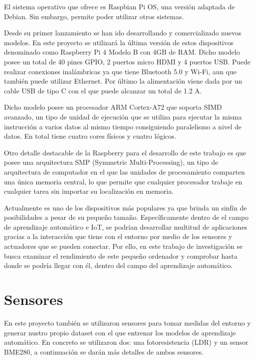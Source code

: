 \documentclass[a4paper, 12pt]{book}
\begin{document}
El sistema operativo que ofrece es Raspbian Pi OS, una versión adaptada de Debian. Sin embargo, permite poder utilizar otros sistemas.

Desde su primer lanzamiento se han ido desarrollando y comercializado nuevos modelos. En este proyecto se utilizará la última versión de estos dispositivos denominado como Raspberry Pi 4 Modelo B con 4GB de RAM. Dicho modelo posee un total de 40 pines GPIO, 2 puertos micro HDMI y 4 puertos USB. Puede realizar conexiones inalámbricas ya que tiene Bluetooth 5.0 y Wi-Fi, aun que también puede utilizar Ethernet. Por último la alimentación viene dada por un cable USB de tipo C con el que puede alcanzar un total de 1.2 A.

Dicho modelo posee un procesador ARM Cortex-A72 que soporta SIMD avanzado, un tipo de unidad de ejecución que se utiliza para ejecutar la misma instrucción a varios datos al mismo tiempo consiguiendo paralelismo a nivel de datos. En total tiene cuatro cores físicos y cuatro lógicos. 

Otro detalle destacable de la Raspberry para el desarrollo de este trabajo es que posee una arquitectura SMP (Symmetric Multi-Processing), un tipo de arquitectura de computador en el que las unidades de procesamiento comparten una única memoria central, lo que permite que cualquier procesador trabaje en cualquier tarea sin importar su localización en memoria. 

Actualmente es uno de los dispositivos más populares ya que brinda un sinfín de posibilidades a pesar de su pequeño tamaño. Específicamente dentro de el campo de aprendizaje automático e IoT, se podrían desarrollar multitud de aplicaciones gracias a la interacción que tiene con el entorno por medio de los sensores y actuadores que se pueden conectar. Por ello, en este trabajo de investigación se busca examinar el rendimiento de este pequeño ordenador y comprobar hasta donde se podría llegar con él, dentro del campo del aprendizaje automático. 


\section{Sensores}
\label{sec:sensores}

En este proyecto también se utilizaron sensores para tomar medidas del entorno y generar nustro propio dataset con el que entrenar los modelos de aprendizaje automático. En concreto se utilizaron dos: una fotoresistencia (LDR) y un sensor BME280, a continuación se darán más detalles de ambos sensores.
\end{document}
